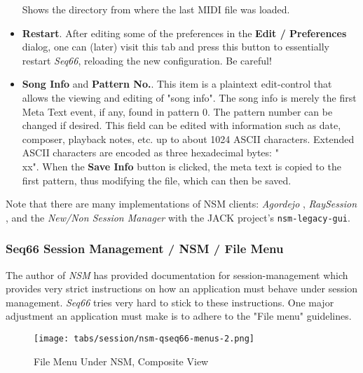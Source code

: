 \begin{itemize}
         Shows the directory from where the last MIDI file was loaded.
      \item \textbf{Restart}.
         After editing some of the preferences in the \textbf{Edit / Preferences}
         dialog, one can (later)
         visit this tab and press this button to essentially
         restart \textsl{Seq66}, reloading the new configuration.
         Be careful!
      \item \textbf{Song Info} and \textbf{Pattern No.}.
         This item is a plaintext edit-control that allows the viewing and
         editing of "song info".
         The song info is merely the first Meta Text event, if any,
         found in pattern 0.
         The pattern number can be changed if desired.
         This field can be edited with information such as date, composer,
         playback notes, etc. up to about 1024 ASCII characters.
         Extended ASCII characters are encoded as three hexadecimal
         bytes: "\\xx".
         When the \textbf{Save Info} button is clicked, the meta text
         is copied to the first pattern, thus modifying the file, which
         can then be saved.
   \end{itemize}

   Note that there are many implementations of NSM clients:
   \textsl{Agordejo} \cite{agordejo},
   \textsl{RaySession} \cite{raysession},
   and the
   \textsl{New/Non Session Manager} \cite{nsm}
   with the JACK project's \texttt{nsm-legacy-gui}.

\subsubsection{Seq66 Session Management / NSM / File Menu}
\label{subsubsec:sessions_file_menu}

   The author of \textsl{NSM} has provided documentation for session-management
   which provides very strict instructions on how an application must behave
   under session management.  \textsl{Seq66} tries very hard to stick to these
   instructions.  One major adjustment an application must make is to adhere to
   the "File menu" guidelines.

\begin{figure}[H]
   \centering 
   \texttt{[image: tabs/session/nsm-qseq66-menus-2.png]}
   \caption*{File Menu Under NSM, Composite View}
\end{figure}

